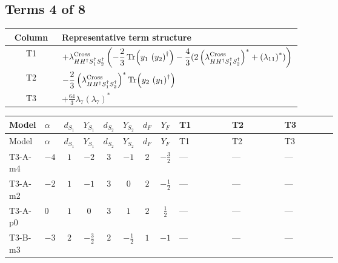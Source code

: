 \documentclass[8pt]{article}
\begin{document}
\begin{landscape}
\subsection*{Terms 4 of 8}
\begin{center}
\begin{tabular}{@{}c >{\raggedright\arraybackslash}p{0.82\linewidth}@{}}
\toprule
Column & Representative term structure \\
\midrule
T1 & \(\displaystyle +{\lambda_{H H^\dagger S_1^\dagger S_2^\dagger}^{\rm Cross}} \left(-\frac{2}{3} \operatorname{Tr}\!\left({y_1}\,\left({y_2}\right)^{\dagger}\right)-\frac{4}{3} (2 \left({\lambda_{H H^\dagger S_1^\dagger S_2^\dagger}^{\rm Cross}}\right)^{*}+\left({\lambda_{11}}\right)^{*})\right)\) \\
\midrule
T2 & \(\displaystyle -\frac{2}{3} \left({\lambda_{H H^\dagger S_1^\dagger S_2^\dagger}^{\rm Cross}}\right)^{*} \operatorname{Tr}\!\left({y_2}\,\left({y_1}\right)^{\dagger}\right)\) \\
\midrule
T3 & \(\displaystyle +\frac{64}{3} {\lambda_{7}} \left({\lambda_{7}}\right)^{*}\) \\
\midrule
\bottomrule
\end{tabular}
\end{center}
\smallskip
\tiny
\begin{longtable}{@{}llcccccc >{\raggedright\arraybackslash}p{0.21\linewidth} >{\raggedright\arraybackslash}p{0.21\linewidth} >{\raggedright\arraybackslash}p{0.21\linewidth}@{}}
\toprule
Model & $\alpha$ & $d_{S_1}$ & $Y_{S_1}$ & $d_{S_2}$ & $Y_{S_2}$ & $d_F$ & $Y_F$ & T1 & T2 & T3 \\
\midrule
\endfirsthead
\toprule
Model & $\alpha$ & $d_{S_1}$ & $Y_{S_1}$ & $d_{S_2}$ & $Y_{S_2}$ & $d_F$ & $Y_F$ & T1 & T2 & T3 \\
\midrule
\endhead
T3-A-m4 & $-4$ & $1$ & $-2$ & $3$ & $-1$ & $2$ & $-\frac{3}{2}$ & --- & --- & --- \\
\midrule
T3-A-m2 & $-2$ & $1$ & $-1$ & $3$ & $0$ & $2$ & $-\frac{1}{2}$ & --- & --- & --- \\
\midrule
T3-A-p0 & $0$ & $1$ & $0$ & $3$ & $1$ & $2$ & $\frac{1}{2}$ & --- & --- & --- \\
\midrule
T3-B-m3 & $-3$ & $2$ & $-\frac{3}{2}$ & $2$ & $-\frac{1}{2}$ & $1$ & $-1$ & --- & --- & --- \\
\midrule

\end{longtable}
\end{landscape}
\end{document}
